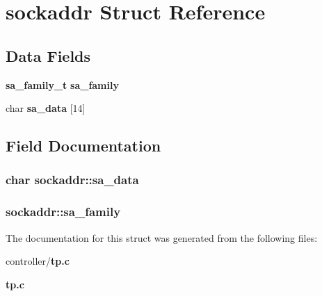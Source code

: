 \section{sockaddr Struct Reference}
\label{structsockaddr}
\subsection*{Data Fields}
\begin{DoxyCompactItemize}
\item 
{\bf sa\_\-family\_\-t} {\bf sa\_\-family}
\item 
char {\bf sa\_\-data} [14]
\end{DoxyCompactItemize}


\subsection{Field Documentation}
\subsubsection[{sa\_\-data}]{\setlength{\rightskip}{0pt plus 5cm}char {\bf sockaddr::sa\_\-data}}\label{structsockaddr_a82791edaa35776a38d75182edb0f5a3d}
\subsubsection[{sa\_\-family}]{ {\bf sockaddr::sa\_\-family}}\label{structsockaddr_ac6ef02e9a2e90a30218132ffd7b5a5c5}


The documentation for this struct was generated from the following files:\begin{DoxyCompactItemize}
\item 
controller/{\bf tp.c}\item 
{\bf tp.c}\end{DoxyCompactItemize}
